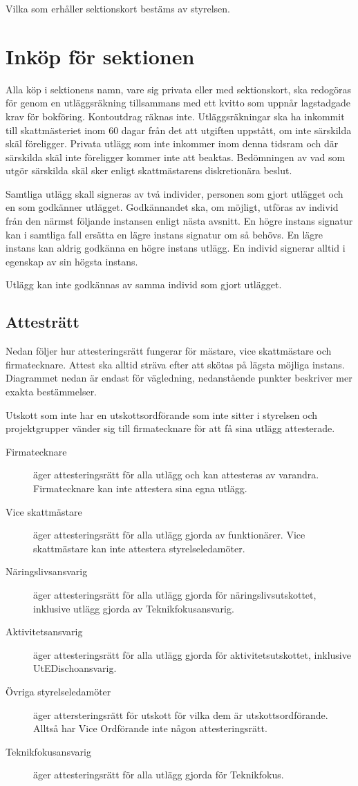 \documentclass{dsekprotokoll}
\begin{document}
Vilka som erhåller sektionskort bestäms av styrelsen.

\section{Inköp för sektionen}
Alla köp i sektionens namn, vare sig privata eller med sektionskort, 
ska redogöras för genom en utläggsräkning tillsammans med ett kvitto som uppnår lagstadgade krav för bokföring. 
Kontoutdrag räknas inte. Utläggsräkningar ska ha inkommit till skattmästeriet inom 60 dagar från det att utgiften uppstått, om inte särskilda skäl föreligger.
Privata utlägg som inte inkommer inom denna tidsram och där särskilda skäl inte föreligger kommer inte att beaktas. Bedömningen av vad som utgör särskilda skäl sker enligt
skattmästarens diskretionära beslut.

Samtliga utlägg skall signeras av två individer, personen som gjort utlägget och
en som godkänner utlägget. Godkännandet ska, om möjligt, utföras av individ
från den närmst följande instansen enligt nästa avsnitt. En högre instans
signatur kan i samtliga fall ersätta en lägre instans signatur om så
behövs. En lägre instans kan aldrig godkänna en högre instans utlägg. En individ
signerar alltid i egenskap av sin högsta instans.

Utlägg kan inte godkännas av samma individ som gjort utlägget.

\subsection{Attesträtt}
Nedan följer hur attesteringsrätt fungerar för mästare, vice skattmästare och
firmatecknare.  Attest ska alltid sträva efter att skötas på lägsta möjliga
instans. Diagrammet nedan är endast för vägledning, nedanstående punkter
beskriver mer exakta bestämmelser.

Utskott som inte har en utskottsordförande som inte sitter i styrelsen och
projektgrupper vänder sig till firmatecknare för att få sina utlägg
attesterade.

\begin{description}
  \item[Firmatecknare] äger attesteringsrätt för alla utlägg och kan attesteras
    av varandra. Firmatecknare kan inte attestera sina egna utlägg.
  \item[Vice skattmästare] äger attesteringsrätt för alla utlägg gjorda av
    funktionärer. Vice skattmästare kan inte attestera styrelseledamöter.
  \item[Näringslivsansvarig] äger attesteringsrätt för alla utlägg gjorda för
    näringslivsutskottet, inklusive utlägg gjorda av Teknikfokusansvarig.
  \item[Aktivitetsansvarig] äger attesteringsrätt för alla utlägg gjorda för
    aktivitetsutskottet, inklusive UtEDischoansvarig.
  \item[Övriga styrelseledamöter] äger attersteringsrätt för utskott för vilka
    dem är utskottsordförande. Alltså har Vice Ordförande inte någon
    attesteringsrätt.
  \item[Teknikfokusansvarig] äger attesteringsrätt för alla utlägg gjorda för
    Teknikfokus.
\end{description}
\end{document}
